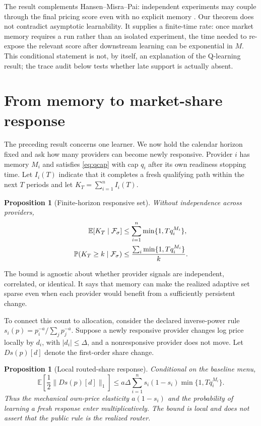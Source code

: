 \documentclass[10pt,twocolumn]{article}
\newtheorem{proposition}[theorem]{Proposition}
\newcommand{\E}{\mathbb{E}}
\newcommand{\Prb}{\mathbb{P}}
\begin{document}
The result complements Hansen--Misra--Pai: independent experiments may couple
through the final pricing score even with no explicit memory
\citep{hansen2021}.  Our theorem does not contradict asymptotic learnability.
It supplies a finite-time rate: once market memory requires a run rather than
an isolated experiment, the time needed to re-expose the relevant score after
downstream learning can be exponential in $M$.  This conditional statement is
not, by itself, an explanation of the Q-learning result; the trace audit below
tests whether late support is actually absent.

\section{From memory to market-share response}

The preceding result concerns one learner.  We now hold the calendar horizon
fixed and ask how many providers can become newly responsive.  Provider $i$
has memory $M_i$ and satisfies \cref{eq:qcap} with cap $q_i$ after its own
readiness stopping time.  Let $I_i(T)$ indicate that it completes a fresh
qualifying path within the next $T$ periods and let
$K_T=\sum_{i=1}^n I_i(T)$.

\begin{proposition}[Finite-horizon responsive set]
Without independence across providers,
\begin{align}
 \E[K_T\mid\mathcal F_\sigma]
 &\le \sum_{i=1}^n \min\{1,Tq_i^{M_i}\},\notag\\
 \Prb(K_T\ge k\mid\mathcal F_\sigma)
 &\le \frac{\sum_i\min\{1,Tq_i^{M_i}\}}{k}.
 \label{eq:responsive-count}
\end{align}
\label{prop:responsive}
\end{proposition}

The bound is agnostic about whether provider signals are independent,
correlated, or identical.  It says that memory can make the realized adaptive
set sparse even when each provider would benefit from a sufficiently persistent
change.

To connect this count to allocation, consider the declared inverse-power rule
$s_i(p)=p_i^{-a}/\sum_j p_j^{-a}$.  Suppose a newly responsive provider changes
log price locally by $d_i$, with $|d_i|\le\Delta$, and a nonresponsive provider
does not move.  Let $Ds(p)[d]$ denote the first-order share change.

\begin{proposition}[Local routed-share response]
Conditional on the baseline menu,
\begin{equation}
 \E\!\left[\frac12\lVert Ds(p)[d]\rVert_1\right]
 \le a\Delta\sum_{i=1}^n s_i(1-s_i)
       \min\{1,Tq_i^{M_i}\}.
 \label{eq:share-response}
\end{equation}
Thus the mechanical own-price elasticity $a(1-s_i)$ and the probability of
learning a fresh response enter multiplicatively.  The bound is local and does
not assert that the public rule is the realized router.
\label{prop:share-response}
\end{proposition}
\end{document}
